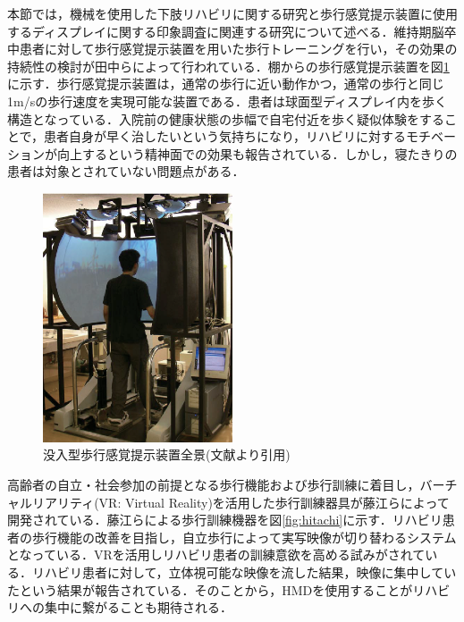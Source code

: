 本節では，機械を使用した下肢リハビリに関する研究と歩行感覚提示装置に使用するディスプレイに関する印象調査に関連する研究について述べる．維持期脳卒中患者に対して歩行感覚提示装置を用いた歩行トレーニングを行い，その効果の持続性の検討\cite{筑波歩行感覚提示}が田中らによって行われている．棚からの歩行感覚提示装置を図\ref{fig:tukuba}に示す．歩行感覚提示装置は，通常の歩行に近い動作かつ，通常の歩行と同じ1m/sの歩行速度を実現可能な装置である．患者は球面型ディスプレイ内を歩く構造となっている．入院前の健康状態の歩幅で自宅付近を歩く疑似体験をすることで，患者自身が早く治したいという気持ちになり，リハビリに対するモチベーションが向上するという精神面での効果も報告されている．しかし，寝たきりの患者は対象とされていない問題点がある．
\fi

\begin{figure}[tbp]
	\centering
			\includegraphics[width=0.5\textwidth]{chap1-figure/tukuba.eps}
	\caption{没入型歩行感覚提示装置全景(文献\cite{筑波歩行感覚提示画像}より引用)}
	\label{fig:tukuba}
\end{figure}

高齢者の自立・社会参加の前提となる歩行機能および歩行訓練に着目し，バーチャルリアリティ(VR: Virtual Reality)を活用した歩行訓練器具\cite{日立}が藤江らによって開発されている．藤江らによる歩行訓練機器を図\ref{fig:hitachi}に示す．リハビリ患者の歩行機能の改善を目指し，自立歩行によって実写映像が切り替わるシステムとなっている．VRを活用しリハビリ患者の訓練意欲を高める試みがされている．リハビリ患者に対して，立体視可能な映像を流した結果，映像に集中していたという結果が報告されている．そのことから，HMDを使用することがリハビリへの集中に繋がることも期待される．

